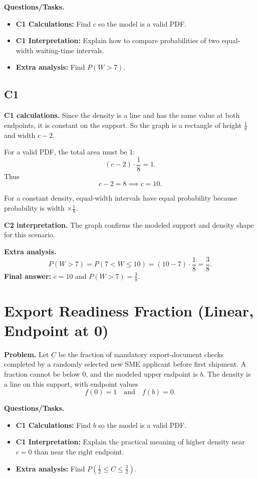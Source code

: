 	\textbf{Questions/Tasks.}
	\begin{itemize}
		\item \textbf{C1 Calculations:} Find $c$ so the model is a valid PDF.
		\item \textbf{C1 Interpretation:} Explain how to compare probabilities of two equal-width waiting-time intervals.
		\item \textbf{Extra analysis:} Find $P(W>7)$.
	\end{itemize}
	
	\subsection*{C1}
	
	\textbf{C1 calculations.}
	Since the density is a line and has the same value at both endpoints, it is constant on the support. So the graph is a rectangle of height $\frac18$ and width $c-2$.
	
	For a valid PDF, the total area must be $1$:
	\[
	(c-2)\cdot\frac18=1.
	\]
	Thus
	\[
	c-2=8\implies c=10.
	\]
	
	For a constant density, equal-width intervals have equal probability because probability is width $\times \frac18$.
	
	\textbf{C2 interpretation.}
	The graph confirms the modeled support and density shape for this scenario.
	
	\textbf{Extra analysis.}
	\[
	P(W>7)=P(7<W\le10)=(10-7)\cdot\frac18=\frac38.
	\]
	\textbf{Final answer:} $c=10$ and $P(W>7)=\frac38$.
	
	\section{Export Readiness Fraction (Linear, Endpoint at 0)}
	
	\textbf{Problem.}
	Let $C$ be the fraction of mandatory export-document checks completed by a randomly selected new SME applicant before first shipment. A fraction cannot be below $0$, and the modeled upper endpoint is $b$. The density is a line on this support, with endpoint values
	\[
	f(0)=1
	\quad\text{and}\quad
	f(b)=0.
	\]
	
	\textbf{Questions/Tasks.}
	\begin{itemize}
		\item \textbf{C1 Calculations:} Find $b$ so the model is a valid PDF.
		\item \textbf{C1 Interpretation:} Explain the practical meaning of higher density near $c=0$ than near the right endpoint.
		\item \textbf{Extra analysis:} Find $P\!\left(\frac{1}{2}\le C\le \frac{3}{2}\right)$.
	\end{itemize}
	
